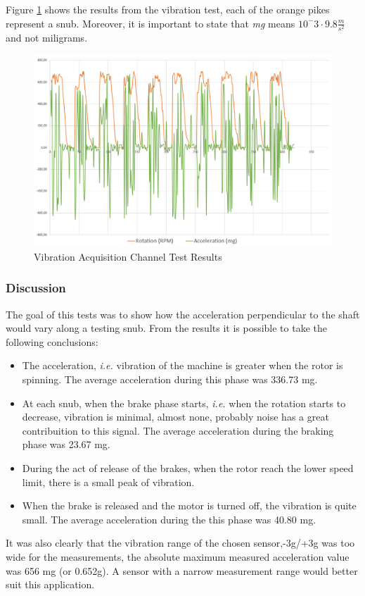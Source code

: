 		Figure \ref{fig:test-vibration} shows the results from the vibration test, each of the orange pikes represent a snub. Moreover, it is important to state that \textit{mg} means $10^-3 \cdot 9.8 \frac{m}{s^2}$ and not miligrams.

		\begin{figure}[htbp]
			\centering
			\includegraphics[width=.9\textwidth]{figuras/fig-test-vibration}
			\caption{Vibration Acquisition Channel Test Results}
			\label{fig:test-vibration}
		\end{figure}

	\subsubsection{Discussion}

		The goal of this tests was to show how the acceleration perpendicular to the shaft would vary along a testing snub. From the results it is possible to take the following conclusions:

		\begin{itemize}
			\item The acceleration, \textit{i.e.} vibration of the machine is greater when the rotor is spinning. The average acceleration during this phase was 336.73 mg.
			\item At each snub, when the brake phase starts, \textit{i.e.} when the rotation starts to decrease, vibration is minimal, almost none, probably noise has a great contribuition to this signal. The average acceleration during the braking phase was 23.67 mg.
			\item During the act of release of the brakes, when the rotor reach the lower speed limit, there is a small peak of vibration.
			\item When the brake is released and the motor is turned off, the vibration is quite small. The average acceleration during the this phase was 40.80 mg.
		\end{itemize}

		It was also clearly that the vibration range of the chosen sensor,-3g/+3g \cite{devices2010adxl335} was too wide for the measurements, the absolute maximum measured acceleration value was 656 mg (or 0.652g). A sensor with a narrow measurement range would better suit this application.